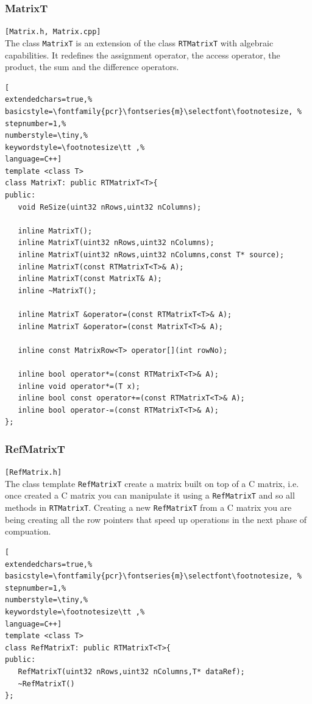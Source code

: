 \subsubsection{MatrixT}
\texttt{[Matrix.h, Matrix.cpp]} \\
The class \texttt{MatrixT} is an extension of the class \texttt{RTMatrixT} with algebraic capabilities. It redefines the assignment operator, the access operator, the product, the sum and the difference operators.

\begin{lstlisting}[
extendedchars=true,%
basicstyle=\fontfamily{pcr}\fontseries{m}\selectfont\footnotesize, %
stepnumber=1,%
numberstyle=\tiny,%
keywordstyle=\footnotesize\tt ,%
language=C++]
template <class T>
class MatrixT: public RTMatrixT<T>{
public:
   void ReSize(uint32 nRows,uint32 nColumns);

   inline MatrixT();
   inline MatrixT(uint32 nRows,uint32 nColumns);
   inline MatrixT(uint32 nRows,uint32 nColumns,const T* source);
   inline MatrixT(const RTMatrixT<T>& A);
   inline MatrixT(const MatrixT& A);
   inline ~MatrixT();

   inline MatrixT &operator=(const RTMatrixT<T>& A);
   inline MatrixT &operator=(const MatrixT<T>& A);

   inline const MatrixRow<T> operator[](int rowNo);

   inline bool operator*=(const RTMatrixT<T>& A);
   inline void operator*=(T x);
   inline bool const operator+=(const RTMatrixT<T>& A);
   inline bool operator-=(const RTMatrixT<T>& A);
};
\end{lstlisting}



\subsubsection{RefMatrixT}
\texttt{[RefMatrix.h]} \\
The class template \texttt{RefMatrixT} create a matrix built on top of a C matrix, i.e. once created a C matrix you can manipulate it using a \texttt{RefMatrixT} and so all methods in \texttt{RTMatrixT}. Creating a new \texttt{RefMatrixT} from a C matrix you are being creating all the row pointers that speed up operations in the next phase of compuation.

\begin{lstlisting}[
extendedchars=true,%
basicstyle=\fontfamily{pcr}\fontseries{m}\selectfont\footnotesize, %
stepnumber=1,%
numberstyle=\tiny,%
keywordstyle=\footnotesize\tt ,%
language=C++]
template <class T>
class RefMatrixT: public RTMatrixT<T>{
public:
   RefMatrixT(uint32 nRows,uint32 nColumns,T* dataRef);
   ~RefMatrixT()
};
\end{lstlisting}



